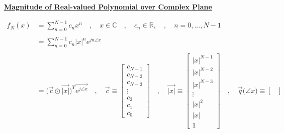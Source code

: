 \documentclass{article}
\begin{document}
\textbf{\underline{Magnitude of Real-valued Polynomial over Complex Plane}}

\begin{align*}
    f_{N}(x)&= \sum^{N - 1}_{n = 0}c_{n}x^{n} \quad , \quad x \in \mathbb{C} \quad , \quad c_n \in \mathbb{R}, \quad , \quad n = 0, ..., N - 1 \\ \\
            &= \sum^{N - 1}_{n = 0}c_{n}|x|^{n}e^{jn\angle{x}} \\ \\
            &= \Big(\vec{c} \odot \vec{|x|}\Big)^{T}\vec{e^{j\angle{x}}} \quad , \quad
                                     \vec{c} \equiv \begin{bmatrix}
                                                        c_{N - 1} \\
                                                        c_{N - 2} \\
                                                        c_{N - 3} \\
                                                        \vdots \\
                                                        c_{2} \\
                                                        c_{1} \\
                                                        c_{0}
                                                      \end{bmatrix} \quad , \quad
                                   \vec{|x|} \equiv \begin{bmatrix}
                                                        |x|^{N - 1} \\
                                                        |x|^{N - 2} \\
                                                        |x|^{N - 3} \\
                                                        \vdots \\
                                                        |x|^{2} \\
                                                        |x| \\
                                                        1
                                                      \end{bmatrix} \quad , \quad
                \vec{q}\big(\angle{x}\big) \equiv \begin{bmatrix}

\end{bmatrix}
\end{align*}
\end{document}
